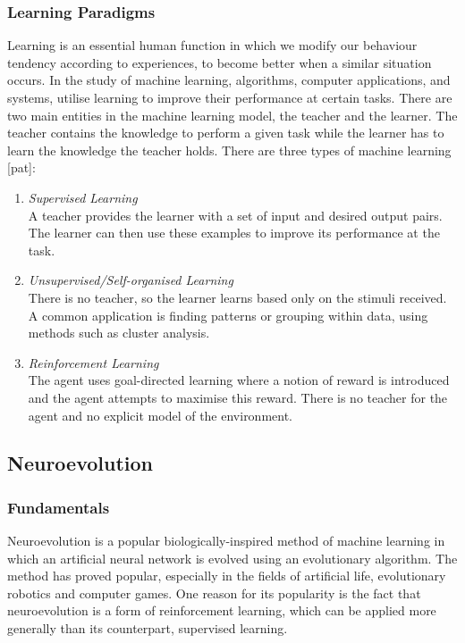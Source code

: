 \documentclass[11pt,a4paper]{article}
\begin{document}
\subsubsection{Learning Paradigms}
Learning is an essential human function in which we modify our behaviour tendency according to experiences, to become better when a similar situation occurs. In the study of machine learning, algorithms, computer applications, and systems, utilise learning to improve their performance at certain tasks. There are two main entities in the machine learning model, the teacher and the learner. The teacher contains the knowledge to perform a given task while the learner has to learn the knowledge the teacher holds. \cite{swarmann} There are three types of machine learning [pat]:
\begin{enumerate}
\item \emph{Supervised Learning}\\
A teacher provides the learner with a set of input and desired output pairs. The learner can then use these examples to improve its performance at the task.
\item \emph{Unsupervised/Self-organised Learning}\\
There is no teacher, so the learner learns based only on the stimuli received. A common application is finding patterns or grouping within data, using methods such as cluster analysis.
\item \emph{Reinforcement Learning}\\
The agent uses goal-directed learning where a notion of reward is introduced and the agent attempts to maximise this reward. There is no teacher for the agent and no explicit model of the environment.
\end{enumerate}
\newpage
\subsection{Neuroevolution}
\subsubsection{Fundamentals}
Neuroevolution is a popular biologically-inspired method of machine learning in which an artificial neural network is evolved using an evolutionary algorithm. The method has proved popular, especially in the fields of artificial life, evolutionary robotics and computer games. One reason for its popularity is the fact that neuroevolution is a form of reinforcement learning, which can be applied more generally than its counterpart, supervised learning. 
\end{document}
